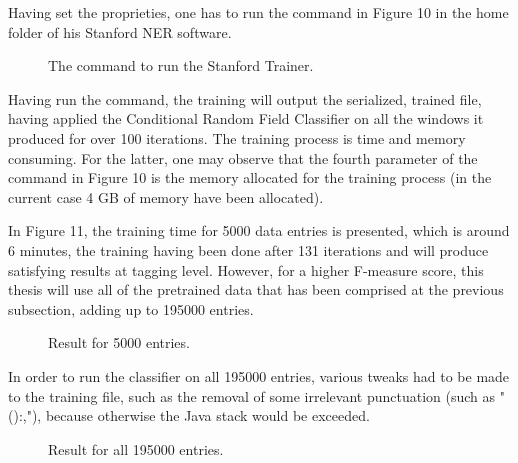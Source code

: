 \documentclass[12pt,a4paper]{article}
\begin{document}
\qquad Having set the proprieties, one has to run the command in Figure 10 in the home folder of his Stanford NER software.

\begin{figure}[h!]
\begin{center}
\end{center}
\caption{The command to run the Stanford Trainer.}
\end{figure}

\qquad Having run the command, the training will output the serialized, trained file, having applied the Conditional Random Field Classifier on all the windows it produced for over 100 iterations. The training process is time and memory consuming. For the latter, one may observe that the fourth parameter of the command in Figure 10 is the memory allocated for the training process (in the current case 4 GB of memory have been allocated). 

\qquad In Figure 11, the training time for 5000 data entries is presented, which is around 6 minutes, the training having been done after 131 iterations and will produce satisfying results at tagging level. However, for a higher F-measure score, this thesis will use all of the pretrained data that has been comprised at the previous subsection, adding up to 195000 entries.

\begin{figure}[h!]
\begin{center}
\end{center}
\caption{Result for 5000 entries.}
\end{figure}

\qquad In order to run the classifier on all 195000 entries, various tweaks had to be made to the training file, such as the removal of some irrelevant punctuation (such as "():,"), because otherwise the Java stack would be exceeded. 

\begin{figure}[h!]
\begin{center}
\end{center}
\caption{Result for all 195000 entries.}
\end{figure}
\end{document}
